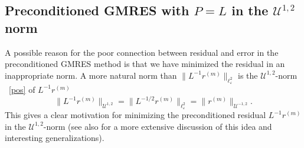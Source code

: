 \documentclass[12pt,reqno]{amsart}
\begin{document}
\subsection{Preconditioned GMRES with $P={{L}}$ in the ${\mathcal{U}}^{1,2}$ norm}
\label{sec:PQ-GMRES}
A possible reason for the poor connection between residual and error
in the preconditioned GMRES method is that we have minimized the
residual in an inappropriate norm.  A more natural norm than $\|
{{L}}^{-1} r^{(m)}\|_{\ell^2_{\varepsilon}}$ is the ${\mathcal{U}}^{1,2}$-norm ~\eqref{pos} of ${{L}}^{-1}
r^{(m)}$
\begin{displaymath}
  \| {{L}}^{-1} r^{(m)} \|_{{\mathcal{U}}^{1,2}}= \| {{L}}^{-1/2} r^{(m)}\|_{\ell^2_{\varepsilon}}=\|r^{(m)}\|_{{\mathcal{U}}^{-1,2}}.
\end{displaymath}
This gives a clear motivation for minimizing the preconditioned
residual ${{L}}^{-1} r^{(m)}$ in the ${\mathcal{U}}^{1,2}$-norm (see also
\cite[Sec. 13]{Simoncini:2007} for a more extensive discussion of this
idea and interesting generalizations).
\end{document}
